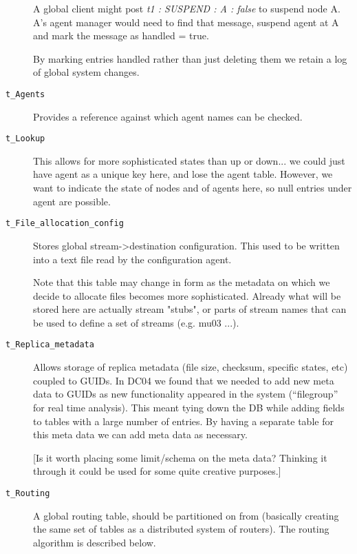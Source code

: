 \documentclass{cmspaper}
\begin{document}
\begin{description}
    A global client might post {\em t1 : SUSPEND : A : false} to suspend
    node A.  A's agent manager would need to find that message, suspend
    agent at A and mark the message as handled = true.

    By marking entries handled rather than just deleting them we
    retain a log of global system changes.

  \item [\texttt{t\_Agents}]\mbox{}

    Provides a reference against which agent names can be checked.

  \item [\texttt{t\_Lookup}]\mbox{}

    This allows for more sophisticated states than up or down... we
    could just have agent as a unique key here, and lose the agent
    table.  However, we want to indicate the state of nodes and of
    agents here, so null entries under agent are possible.

  \item [\texttt{t\_File\_allocation\_config}]\mbox{}

    Stores global stream->destination configuration.  This used to be
    written into a text file read by the configuration agent.
    
    Note that this table may change in form as the metadata on which we
    decide to allocate files becomes more sophisticated. Already what will
    be stored here are actually stream "stubs", or parts of stream names
    that can be used to define a set of streams (e.g. mu03 ...).

  \item [\texttt{t\_Replica\_metadata}]\mbox{}

    Allows storage of replica metadata (file size, checksum, specific
    states, etc) coupled to GUIDs.  In DC04 we found that we needed to
    add new meta data to GUIDs as new functionality appeared in the
    system (``filegroup'' for real time analysis).  This meant tying
    down the DB while adding fields to tables with a large number of
    entries.  By having a separate table for this meta data we can add
    meta data as necessary.

    [Is it worth placing some limit/schema on the meta data?  Thinking
    it through it could be used for some quite creative purposes.]

  \item [\texttt{t\_Routing}]\mbox{}

    A global routing table, should be partitioned on from (basically
    creating the same set of tables as a distributed system of
    routers).  The routing algorithm is described below.
\end{description}
\end{document}

